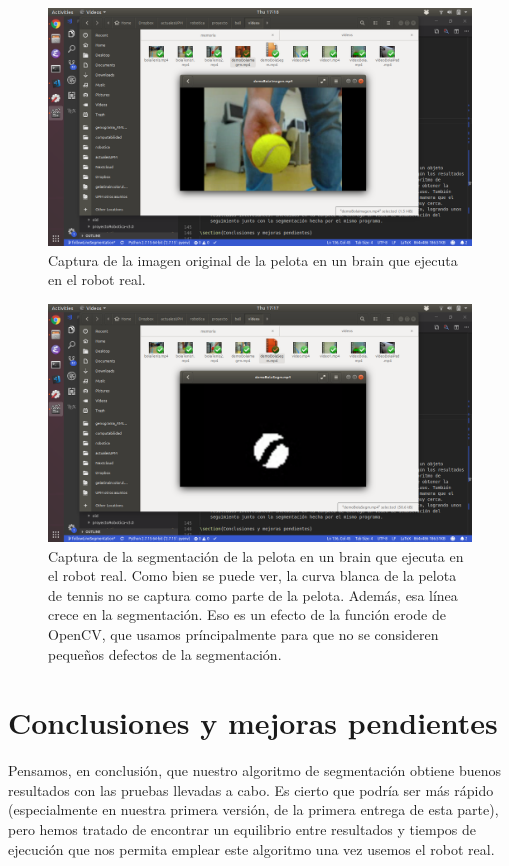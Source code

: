 \documentclass{article}
\begin{document}
	\begin{figure}[H]
	    \centering
	    \includegraphics[width=12cm]{pelota2.png}
	    \caption{Captura de la imagen original de la pelota en un brain que ejecuta en el robot real.}
	    \label{fig:pelota1}
	\end{figure}

	\begin{figure}[H]
	    \centering
	    \includegraphics[width=12cm]{pelota1.png}
	    \caption{Captura de la segmentación de la pelota en un brain que ejecuta en el robot real. Como bien se puede ver, la curva blanca de la pelota de tennis no se captura como parte de la pelota. Además, esa línea crece en la segmentación. Eso es un efecto de la función erode de OpenCV, que usamos príncipalmente para que no se consideren pequeños defectos de la segmentación.}
	    \label{fig:pelota2}
	\end{figure}

\section{Conclusiones y mejoras pendientes}

	Pensamos, en conclusión, que nuestro algoritmo de segmentación obtiene buenos resultados con las pruebas llevadas a cabo. Es cierto que podría ser más rápido (especialmente en nuestra primera versión, de la primera entrega de esta parte), pero hemos tratado de encontrar un equilibrio entre resultados y tiempos de ejecución que nos permita emplear este algoritmo una vez usemos el robot real.
	
\end{document}
